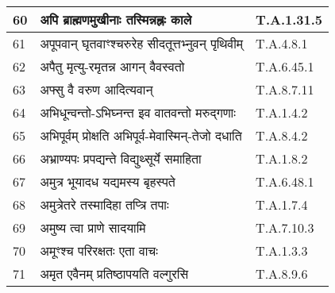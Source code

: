 \documentclass[17pt]{extarticle}
\begin{document}
\begin{longtable}{||p{0.4in}||p{4.9in}||p{0.9in}||}
    \hline
        
    60 & अपि ब्राह्मणमुखीनाः तस्मिन्नह्नः काले & T.A.1.31.5       \\
    
    \hline
        
    61 & अपूपवान् घृतवाꣳश्चरुरेह सीदतूत्तभ्नुवन् पृथिवीम् & T.A.4.8.1       \\
    
    \hline
        
    62 & अपैतु मृत्यु{-}रमृतन्न आगन् वैवस्वतो & T.A.6.45.1       \\
    
    \hline
        
    63 & अफ्सु वै वरुण आदित्यवान् & T.A.8.7.11       \\
    
    \hline
        
    64 & अभिधून्वन्तो{-}ऽभिघ्नन्त इव वातवन्तो मरुद्गणाः & T.A.1.4.2       \\
    
    \hline
        
    65 & अभिपूर्वम् प्रोक्षति अभिपूर्व{-}मेवास्मिन्{-}तेजो दधाति & T.A.8.4.2       \\
    
    \hline
        
    66 & अभ्राण्यपः प्रपद्यन्ते विद्युथ्सूर्ये समाहिता & T.A.1.8.2       \\
    
    \hline
        
    67 & अमुत्र भूयादध यद्यमस्य बृहस्पते & T.A.6.48.1       \\
    
    \hline
        
    68 & अमुत्रेतरे तस्मादिहा तप्त्रि तपाः & T.A.1.7.4       \\
    
    \hline
        
    69 & अमुष्य त्वा प्राणे सादयामि & T.A.7.10.3       \\
    
    \hline
        
    70 & अमूꣳश्च परिरक्षतः एता वाचः & T.A.1.3.3       \\
    
    \hline
        
    71 & अमृत एवैनम् प्रतिष्ठापयति वल्गुरसि & T.A.8.9.6       \\
    
    \hline
        

\end{longtable}
\end{document}
